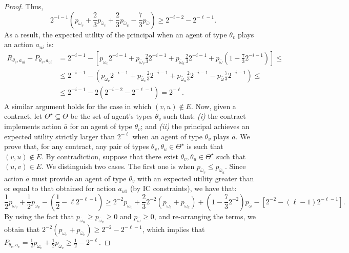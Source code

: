 \begin{proof}
	Thus,
	\[
		2^{-i-1} \left(   p_{\omega_v} + \frac{2}{3} p_{\bar \omega_v} + \frac{2}{3} p_{\bar \omega_{u}} - \frac{7}{3} p_{\bar \omega} \right) \geq 2^{-i-2} - 2^{-\ell-1}.
	\]
	As a result, the expected utility of the principal when an agent of type $\theta_v$ plays an action $a_{u i}$ is:
	\begin{align*}
		R_{\theta_v, a_{ui}} - P_{\theta_v, a_{ui}} & = 2^{-i-1} - \left[ p_{\omega_v} 2^{-i-1} + p_{\bar \omega_v} \frac{2}{3} 2^{-i-1} + p_{\bar \omega_u} \frac{2}{3} 2^{-i-1}	+ p_{\bar \omega} \left(  1 - \frac{7}{3} 2^{-i-1} \right)    \right] \leq \\
		& \leq 2^{-i-1} - \left( p_{\omega_v} 2^{-i-1} + p_{\bar \omega_v} \frac{2}{3} 2^{-i-1} + p_{\bar \omega_u} \frac{2}{3} 2^{-i-1}	-p_{\bar \omega} \frac{7}{3} 2^{-i-1}     \right) \leq \\
		& \leq 2^{-i-1} - 2 \left(  2^{-i-2} - 2^{-\ell-1} \right) = 2^{-\ell}.
	\end{align*}
	A similar argument holds for the case in which $(v,u) \notin E$.
	Now, given a contract, let $\Theta^\star \subseteq \Theta$ be the set of agent's types $\theta_v$ such that: \emph{(i)} the contract implements action $\bar a$ for an agent of type $\theta_v$; and \emph{(ii)} the principal achieves an expected utility strictly larger than $2^{-\ell}$ when an agent of type $\theta_v$ plays $\bar a$.
	We prove that, for any contract, any pair of types $\theta_v, \theta_u \in \Theta^\star$ is such that $(v,u) \notin E$.
	By contradiction, suppose that there exist $\theta_v, \theta_u \in \Theta^\star$ such that $(u,v) \in E$.
	We distinguish two cases.
	The first one is when $p_{\bar \omega_v} \le p_{\bar \omega_{u}}$.
	Since action $\bar a $ must provide an agent of type $\theta_v$ with an expected utility greater than or equal to that obtained for action $a_{u1}$ (by IC constraints), we have that:
	\[
		\frac{1}{2} p_{\omega_v} + \frac{1}{2} p_{\bar \omega_v} - \left( \frac{1}{2} - \ell 2^{-\ell-1}  \right)\geq 2^{-2} p_{\omega_v} + \frac{2}{3} 2^{-2}  \left(  p_{\bar \omega_v} + p_{\bar \omega_{u}} \right) + \left( 1 - \frac{7}{3} 2^{-2} \right) p_{\bar \omega} - \left[  2^{-2} - \left( \ell-1 \right) 2^{-\ell-1}\right].
	\]
	By using the fact that $p_{\bar \omega_u} \geq p_{\bar \omega_{v}} \geq 0$ and $p_{\bar \omega} \geq 0$, and re-arranging the terms, we obtain that $2^{-2} \left(  p_{\omega_{v}} + p_{\bar \omega_{v}} \right) \geq 2^{-2} - 2^{-\ell-1}$, which implies that $P_{\theta_v, a_{\bar v}} = \frac{1}{2} p_{\omega_{v}} + \frac{1}{2} p_{\bar \omega_{v}} \geq \frac{1}{2} - 2^{-\ell}$.

\end{proof}
